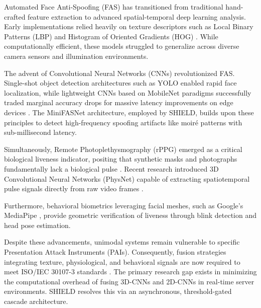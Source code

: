 \documentclass[12pt, a4paper]{report}
\begin{document}
Automated Face Anti-Spoofing (FAS) has transitioned from traditional hand-crafted feature extraction to advanced spatial-temporal deep learning analysis. Early implementations relied heavily on texture descriptors such as Local Binary Patterns (LBP) and Histogram of Oriented Gradients (HOG) \cite{boulkenafet2015face}. While computationally efficient, these models struggled to generalize across diverse camera sensors and illumination environments.

The advent of Convolutional Neural Networks (CNNs) revolutionized FAS. Single-shot object detection architectures such as YOLO \cite{redmon2016you} enabled rapid face localization, while lightweight CNNs based on MobileNet paradigms successfully traded marginal accuracy drops for massive latency improvements on edge devices \cite{howard2017mobilenets}. The MiniFASNet architecture, employed by SHIELD, builds upon these principles to detect high-frequency spoofing artifacts like moiré patterns with sub-millisecond latency.

Simultaneously, Remote Photoplethysmography (rPPG) emerged as a critical biological liveness indicator, positing that synthetic masks and photographs fundamentally lack a biological pulse \cite{poh2010non}. Recent research introduced 3D Convolutional Neural Networks (PhysNet) capable of extracting spatiotemporal pulse signals directly from raw video frames \cite{yu2019remote}. 

Furthermore, behavioral biometrics leveraging facial meshes, such as Google's MediaPipe \cite{lugaresi2019mediapipe}, provide geometric verification of liveness through blink detection and head pose estimation. 

Despite these advancements, unimodal systems remain vulnerable to specific Presentation Attack Instruments (PAIs). Consequently, fusion strategies integrating texture, physiological, and behavioral signals are now required to meet ISO/IEC 30107-3 standards \cite{iso30107}. The primary research gap exists in minimizing the computational overhead of fusing 3D-CNNs and 2D-CNNs in real-time server environments. SHIELD resolves this via an asynchronous, threshold-gated cascade architecture.
\end{document}
